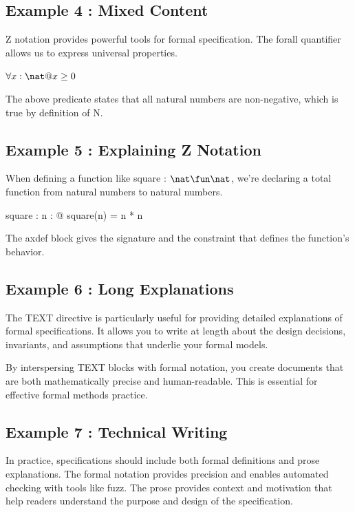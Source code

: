 \documentclass[a4paper,10pt,fleqn]{article}
\begin{document}
\subsection*{Example 4 : Mixed Content}

\noindent Z notation provides powerful tools for formal specification. The forall quantifier allows us to express universal properties.

\bigskip

\noindent
$\forall x : \nat @ x \geq 0$


\noindent The above predicate states that all natural numbers are non-negative, which is true by definition of N.

\bigskip

\subsection*{Example 5 : Explaining Z Notation}

\noindent When defining a function like square : $\nat \fun \nat$, we're declaring a total function from natural numbers to natural numbers.

\bigskip

\begin{axdef}
square : \nat \fun \nat
\where
\forall n : \nat @ square(n) = n * n
\end{axdef}

\noindent The axdef block gives the signature and the constraint that defines the function's behavior.

\bigskip

\subsection*{Example 6 : Long Explanations}

\noindent The TEXT directive is particularly useful for providing detailed explanations of formal specifications. It allows you to write at length about the design decisions, invariants, and assumptions that underlie your formal models.

\bigskip

\noindent By interspersing TEXT blocks with formal notation, you create documents that are both mathematically precise and human-readable. This is essential for effective formal methods practice.

\bigskip

\subsection*{Example 7 : Technical Writing}

\noindent In practice, specifications should include both formal definitions and prose explanations. The formal notation provides precision and enables automated checking with tools like fuzz. The prose provides context and motivation that help readers understand the purpose and design of the specification.

\bigskip
\end{document}
